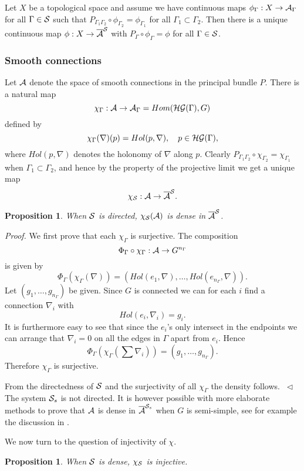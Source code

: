 \documentclass[12pt]{article}
\newcommand{\eproof}{{~\hfill$ \triangleleft$}}
\def\ca{{\cal A}}
\def\cg{{\cal G}}
\def\ch{{\cal H}}
\def\cs{{\cal S}}
\newtheorem{prop}[thm]{Proposition}
\begin{document}
{Let $X$ be a topological space and assume we have continuous maps $\phi_\Gamma :X\to \ca_\Gamma$ for all $\Gamma \in \cs$ such that $P_{\Gamma_1\Gamma_2}\circ \phi_{\Gamma_2}= \phi_{\Gamma_1}$ for all $\Gamma_1\subset \Gamma_2$. Then there is a unique continuous map $\phi: X\to \overline{\ca}^\cs$ with $P_\Gamma \circ \phi_\Gamma=\phi$ for all $\Gamma\in\cs$. 


\subsubsection{Smooth connections} Let $\ca$ denote the space of smooth connections in the principal bundle $P$. There is a natural map 
$$\chi_\Gamma:\ca \to \ca_\Gamma=Hom (\ch\cg(\Gamma ),G)$$ defined by
$$\chi_\Gamma (\nabla )(p )=Hol (p,\nabla ), \quad p\in \ch\cg(\Gamma ),$$
where $Hol(p,\nabla )$ denotes the holonomy of $\nabla$ along $p$. Clearly $P_{\Gamma_1\Gamma_2} \circ\chi_{\Gamma_2}=\chi_{\Gamma_1}$ when $\Gamma_1\subset \Gamma_2$, and hence by the property of the projective limit we get a unique map
$$\chi_\cs :\ca\to \overline{\ca}^\cs.$$

\begin{prop}
When $\cs$ is directed, $\chi_\cs (\ca)$ is dense in $\overline{\ca}^\cs$.
\end{prop}

\textit{Proof.} We first prove that each $\chi_\Gamma$ is surjective. The composition 
$$\Phi_\Gamma \circ\chi_\Gamma:\ca \to G^{n_\Gamma}$$
is given by 
$$\Phi_\Gamma (\chi_\Gamma (\nabla))=(Hol(e_1,\nabla),\ldots , Hol (e_{n_\Gamma},\nabla)).$$
Let $(g_1,\ldots, g_{n_\Gamma})$ be given. Since $G$ is connected we can for each $i$ find a connection $\nabla_i$ with 
$$Hol(e_i , \nabla_i)=g_i.$$
It is furthermore easy to see that since the $e_i$'s only intersect in the endpoints we can arrange that $\nabla_i=0$ on all the edges in $\Gamma$  apart from $e_i$. Hence 
$$\Phi_\Gamma\left(\chi_\Gamma \left(\sum \nabla_i \right) \right)=(g_1,\ldots , g_{n_\Gamma }).$$
Therefore $\chi_\Gamma$ is surjective.
 
From the directedness of $\cs$ and the surjectivity of all $\chi_\Gamma$ the density follows. \eproof\\

The system $\cs_s$ is not directed. It is however possible with more elaborate methods to prove that $\ca$ is dense in $\overline{\ca}^{\cs_s}$ when $G$ is semi-simple, see for example the discussion in \cite{Fl2}. 

We now turn to the question of injectivity of  $\chi$.
\begin{prop}\label{dense}
When $\cs$ is dense, $\chi_\cs$ is injective.
\end{prop}

}
\end{document}
